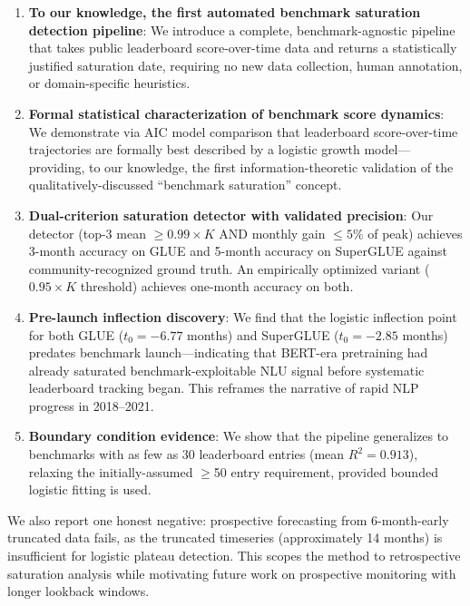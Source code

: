 \begin{enumerate}
  \item \textbf{To our knowledge, the first automated benchmark saturation detection pipeline}: We introduce a complete, benchmark-agnostic pipeline that takes public leaderboard score-over-time data and returns a statistically justified saturation date, requiring no new data collection, human annotation, or domain-specific heuristics.

  \item \textbf{Formal statistical characterization of benchmark score dynamics}: We demonstrate via AIC model comparison that leaderboard score-over-time trajectories are formally best described by a logistic growth model---providing, to our knowledge, the first information-theoretic validation of the qualitatively-discussed ``benchmark saturation'' concept.

  \item \textbf{Dual-criterion saturation detector with validated precision}: Our detector (top-3 mean $\geq 0.99\times K$ AND monthly gain $\leq 5\%$ of peak) achieves 3-month accuracy on GLUE and 5-month accuracy on SuperGLUE against community-recognized ground truth. An empirically optimized variant ($0.95\times K$ threshold) achieves one-month accuracy on both.

  \item \textbf{Pre-launch inflection discovery}: We find that the logistic inflection point for both GLUE ($t_0 = -6.77$ months) and SuperGLUE ($t_0 = -2.85$ months) predates benchmark launch---indicating that BERT-era pretraining \citep{devlin2019bert} had already saturated benchmark-exploitable NLU signal before systematic leaderboard tracking began.
  This reframes the narrative of rapid NLP progress in 2018--2021.

  \item \textbf{Boundary condition evidence}: We show that the pipeline generalizes to benchmarks with as few as 30 leaderboard entries (mean $R^2=0.913$), relaxing the initially-assumed $\geq$50 entry requirement, provided bounded logistic fitting is used.
\end{enumerate}

We also report one honest negative: prospective forecasting from 6-month-early truncated data fails, as the truncated timeseries (approximately 14 months) is insufficient for logistic plateau detection.
This scopes the method to retrospective saturation analysis while motivating future work on prospective monitoring with longer lookback windows.
